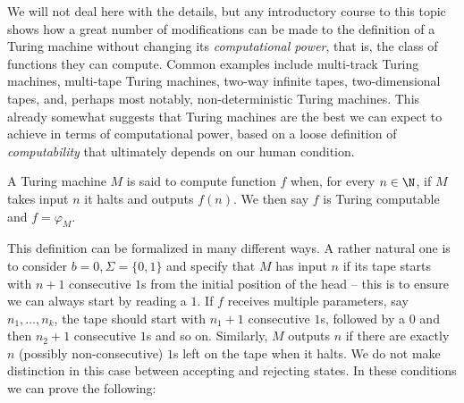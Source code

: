 \documentclass[../main.tex]{memoir}
\begin{document}
We will not deal here with the details, but any introductory course to this topic shows how a great number of modifications can be made to the definition of a Turing machine without changing its \textit{computational power}, that is, the class of functions they can compute. Common examples include multi-track Turing machines, multi-tape Turing machines, two-way infinite tapes, two-dimensional tapes, and, perhaps most notably, non-deterministic Turing machines. This already somewhat suggests that Turing machines are the best we can expect to achieve in terms of computational power, based on a loose definition of \textit{computability} that ultimately depends on our human condition.

\begin{definition}
A Turing machine $M$ is said to compute function $f$ when, for every $n \in \N$, if $M$ takes input $n$ it halts and outputs $f(n)$. We then say $f$ is Turing computable and $f = \varphi_M$.
\end{definition}

This definition can be formalized in many different ways. A rather natural one is to consider $b = 0, \Sigma = \{0, 1\}$ and specify that $M$ has input $n$ if its tape starts with $n + 1$ consecutive $1$s from the initial position of the head -- this is to ensure we can always start by reading a $1$. If $f$ receives multiple parameters, say $n_1, \ldots, n_k$, the tape should start with $n_1 + 1$ consecutive $1$s, followed by a $0$ and then $n_2 + 1$ consecutive $1$s and so on. Similarly, $M$ outputs $n$ if there are exactly $n$ (possibly non-consecutive) $1$s left on the tape when it halts. We do not make distinction in this case between accepting and rejecting states. In these conditions we can prove the following:
\end{document}
